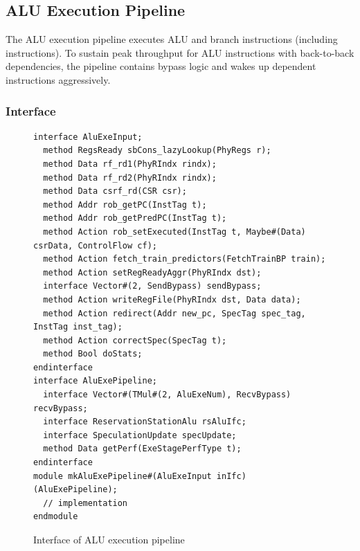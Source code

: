 \subsection{ALU Execution Pipeline}\label{sec:alu-exe-pip}

The ALU execution pipeline executes ALU and branch instructions (including  instructions).
To sustain peak throughput for ALU instructions with back-to-back dependencies, the pipeline contains bypass logic and wakes up dependent instructions aggressively.

\subsubsection{Interface}

\begin{figure}
\begin{lstlisting}[caption={}]
interface AluExeInput;
  method RegsReady sbCons_lazyLookup(PhyRegs r);
  method Data rf_rd1(PhyRIndx rindx);
  method Data rf_rd2(PhyRIndx rindx);
  method Data csrf_rd(CSR csr);
  method Addr rob_getPC(InstTag t);
  method Addr rob_getPredPC(InstTag t);
  method Action rob_setExecuted(InstTag t, Maybe#(Data) csrData, ControlFlow cf);
  method Action fetch_train_predictors(FetchTrainBP train);
  method Action setRegReadyAggr(PhyRIndx dst);
  interface Vector#(2, SendBypass) sendBypass;
  method Action writeRegFile(PhyRIndx dst, Data data);
  method Action redirect(Addr new_pc, SpecTag spec_tag, InstTag inst_tag);
  method Action correctSpec(SpecTag t);
  method Bool doStats;
endinterface
interface AluExePipeline;
  interface Vector#(TMul#(2, AluExeNum), RecvBypass) recvBypass;
  interface ReservationStationAlu rsAluIfc;
  interface SpeculationUpdate specUpdate;
  method Data getPerf(ExeStagePerfType t);
endinterface
module mkAluExePipeline#(AluExeInput inIfc)(AluExePipeline);
  // implementation
endmodule
\end{lstlisting}
\caption{Interface of ALU execution pipeline}\label{fig:alu-exe-pipe-ifc}
\end{figure}

